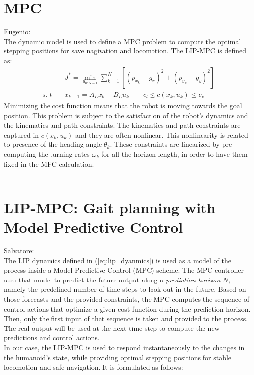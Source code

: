 \documentclass[main.tex]{subfiles}
\begin{document}
\section{MPC}
Eugenio: \\
The dynamic model is used to define a MPC problem to compute the optimal stepping positions for save nagivation and locomotion. The LIP-MPC is defined as:
\begin{align*}
    &J^* = \min_{u_{0:N-1}} \sum_{k=1}^{N}[(p_{x_{k}} - g_{x})^2+(p_{y_{k}} - g_{y})^2]
    \\ \text{s. t} \quad
    &x_{k+1} = A_{L}x_{k} + B_{L}u_{k} \qquad
    c_{l} \le c(x_{k}, u_{k}) \le c_{u}
\end{align*}
Minimizing the cost function means that the robot is moving towards the goal position. This problem is subject to the satisfaction of the robot's dynamics and the kinematics and path constraints. The kinematics and path constraints are captured in $c(x_{k}, u_{k})$ and they are often nonlinear. This nonlinearity is related to presence of the heading angle $\theta_{k}$. These constraints are linearized by pre-computing the turning rates $\bar{\omega}_{k}$ for all the horizon length, in order to have them fixed in the MPC calculation.
\\
\\

\section{LIP-MPC: Gait planning with Model Predictive Control}\label{sec:mpc}
Salvatore:\\
The LIP dynamics defined in (\ref{eq:lip_dyanmics}) is used as a model of the process inside a Model Predictive Control (MPC) scheme. The MPC controller uses that model to predict the future output along a \textit{prediction horizon} $N$, namely the predefined number of time steps to look out in the future. Based on those forecasts and the provided constraints, the MPC computes the sequence of control actions that optimize a given cost function during the prediction horizon. Then, only the first input of that sequence is taken and provided to the process. The real output will be used at the next time step to compute the new predictions and control actions.\\
 In our case, the LIP-MPC is used to respond instantaneously to the changes in the humanoid's state, while providing optimal stepping positions for stable locomotion and safe navigation. It is formulated as follows:
\end{document}
